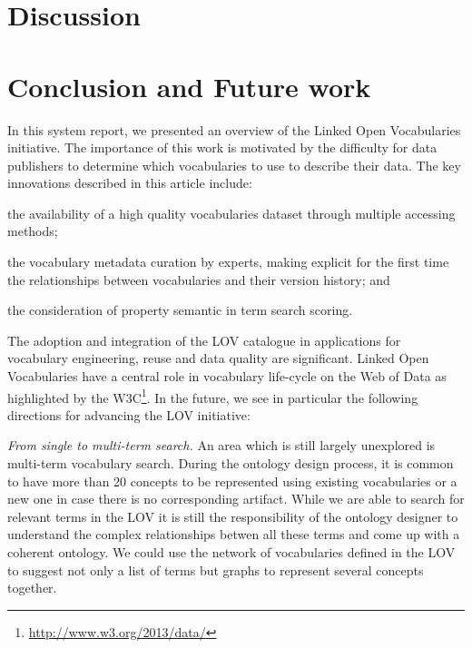 \documentclass{iosart2c}
\begin{document}
\section{Discussion}



\section{Conclusion and Future work}
\label{sec:conclusion}
In this system report, we presented an overview of the Linked Open Vocabularies initiative. The importance of this work is motivated by the difficulty for data publishers to determine which vocabularies to use to describe their data. The key innovations described in this article include: 
\begin{inparaenum}[1)] 
	\item the availability of a high quality vocabularies dataset through multiple accessing methods;
	\item the vocabulary metadata curation by experts, making explicit for the first time the relationships between vocabularies and their version history; and
	\item the consideration of property semantic in term search scoring.
\end{inparaenum}

The adoption and integration of the LOV catalogue in applications for vocabulary engineering, reuse and data quality are significant. Linked Open Vocabularies have a central role in vocabulary life-cycle on the Web of Data as highlighted by the W3C\footnote{\url{http://www.w3.org/2013/data/}}. In the future, we see in particular the following directions for advancing the LOV initiative:

\emph{From single to multi-term search.} An area which is still largely unexplored is multi-term vocabulary search. During the ontology design process, it is common to have more than 20 concepts to be represented using existing vocabularies or a new one in case there is no corresponding artifact. While we are able to search for relevant terms in the LOV it is still the responsibility of the ontology designer to understand the complex relationships betwen all these terms and come up with a coherent ontology. We could use the network of vocabularies defined in the LOV to suggest not only a list of terms but graphs to represent several concepts together.
\end{document}

